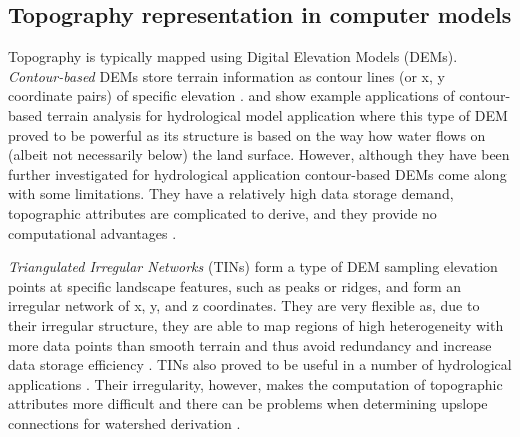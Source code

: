 \DIFaddbegin {}\emph{} \emph{} \emph{} \emph{} \emph{} 

\DIFaddend \subsection{Topography representation in computer models}
\label{sec:review_dems}
Topography is typically mapped using Digital Elevation Models (DEMs).
\emph{Contour-based} DEMs store terrain information as contour lines (or x, y coordinate pairs) of specific elevation \citep{Moore1988}.
\citet{Moore1991b} and \citet{Maurer1997} show example applications of contour-based terrain analysis for hydrological model application where this type of DEM proved to be powerful as its structure is based on the way how water flows on (albeit not necessarily below) the land surface.
However, although they have been further investigated for hydrological application \citep[e.g.,][]{Dawes1994, Maunder1999, Zhang1999, Moretti2008} contour-based DEMs come along with some limitations.
They have a relatively high data storage demand, topographic attributes are complicated to derive, and they provide no computational advantages \citep{Moore1991a}.

\emph{Triangulated Irregular Networks} (TINs) form a type of DEM sampling elevation points at specific landscape features, such as peaks or ridges, and form an irregular network of x, y, and z coordinates.
They are very flexible as, due to their irregular structure, they are able to map regions of high heterogeneity with more data points than smooth terrain and thus avoid redundancy and increase data storage efficiency \citep{Moore1991a, DeVantier1993}.
TINs also proved to be useful in a number of hydrological applications \citep[e.g.,][]{Tucker2001, Vivoni2004, Ivanov2004, Freitas2016}.
Their irregularity, however, makes the computation of topographic attributes more difficult and there can be problems when determining upslope connections for watershed derivation \citep{Moore1991a}.


